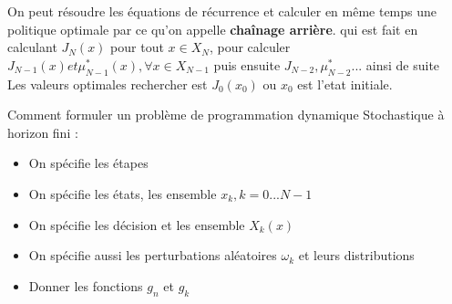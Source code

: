 \documentclass[oneside]{book}
\begin{document}
On peut résoudre les équations de récurrence et calculer en même temps une politique optimale par ce qu'on appelle \textbf{chaînage arrière}. qui est fait en calculant $J_N(x)$ pour tout $x \in X_N$,   pour calculer $J_{N-1}(x) et \mu^*_{N-1}(x), \forall x \in X_{N-1}$ puis ensuite $J_{N-2}, \mu^*_{N-2}$... ainsi de suite\\

Les valeurs optimales rechercher est $J_0(x_0)$ ou $x_0$ est l'etat initiale.

Comment formuler un problème de programmation dynamique Stochastique à horizon fini :\\

\begin{itemize}
\item On spécifie les étapes
\item On spécifie les états, les ensemble $x_k, k=0...N-1$
\item On spécifie les décision et les ensemble $X_k(x)$
\item On spécifie aussi les perturbations aléatoires $\omega_k$ et leurs distributions
\item Donner les fonctions $g_n$ et $g_k$
\end{itemize}
\end{document}
